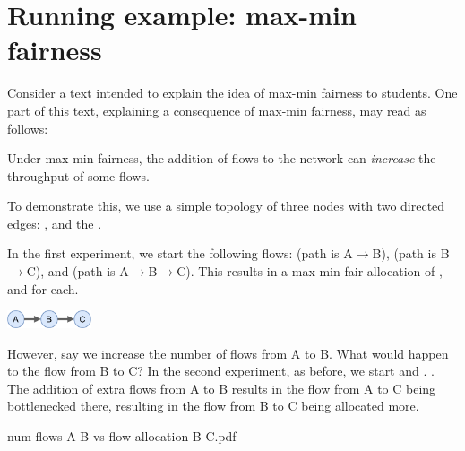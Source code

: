 \section{Running example: max-min fairness}
\label{sec:example}

Consider a text intended to explain the idea of max-min fairness to students. One part of this text, explaining a consequence of max-min fairness, may read as follows:

\vspace{0.2cm}
\begin{mdframed}[style=annotex]

Under max-min fairness, the addition of flows to the network can \emph{increase} the throughput of some flows.

To demonstrate this, we use a simple topology of three nodes with two directed edges:
,
and the .

In the first experiment, we start the following flows:  (path is A$\rightarrow$B),  (path is B$\rightarrow$C), and  (path is A$\rightarrow$B$\rightarrow$C).
This results in a max-min fair allocation of ,  and  for each.

\vspace{-0.0in}
\begin{center}
\includegraphics[width=2.5cm]{figures/topology-example.pdf}
\end{center}
\vspace{-0.0in}

\noindent However, say we increase the number of flows from A to B. What would happen to the flow from B to C? In the second experiment, as before, we start  and . . The addition of extra flows from A to B results in the flow from A to C being bottlenecked there, resulting in the flow from B to C being allocated more.

\begin{center}
{num-flows-A-B-vs-flow-allocation-B-C.pdf}
\end{center}

\end{mdframed}
\vspace{0.2cm}

